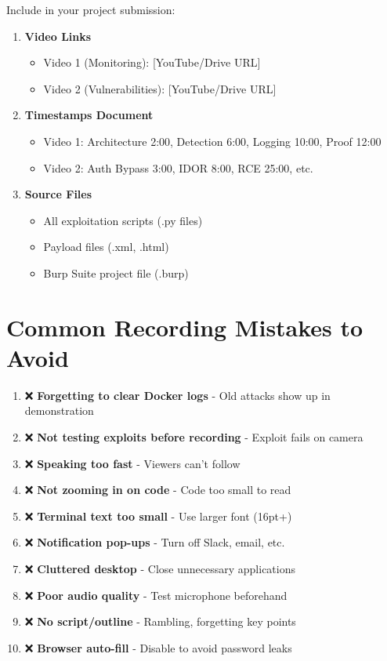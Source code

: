 \documentclass[12pt,a4paper]{article}
\begin{document}
Include in your project submission:

\begin{enumerate}[leftmargin=*]
    \item \textbf{Video Links}
    \begin{itemize}
        \item Video 1 (Monitoring): [YouTube/Drive URL]
        \item Video 2 (Vulnerabilities): [YouTube/Drive URL]
    \end{itemize}
    
    \item \textbf{Timestamps Document}
    \begin{itemize}
        \item Video 1: Architecture 2:00, Detection 6:00, Logging 10:00, Proof 12:00
        \item Video 2: Auth Bypass 3:00, IDOR 8:00, RCE 25:00, etc.
    \end{itemize}
    
    \item \textbf{Source Files}
    \begin{itemize}
        \item All exploitation scripts (.py files)
        \item Payload files (.xml, .html)
        \item Burp Suite project file (.burp)
    \end{itemize}
\end{enumerate}

\section{Common Recording Mistakes to Avoid}

\begin{enumerate}[leftmargin=*]
    \item ❌ \textbf{Forgetting to clear Docker logs} - Old attacks show up in demonstration
    \item ❌ \textbf{Not testing exploits before recording} - Exploit fails on camera
    \item ❌ \textbf{Speaking too fast} - Viewers can't follow
    \item ❌ \textbf{Not zooming in on code} - Code too small to read
    \item ❌ \textbf{Terminal text too small} - Use larger font (16pt+)
    \item ❌ \textbf{Notification pop-ups} - Turn off Slack, email, etc.
    \item ❌ \textbf{Cluttered desktop} - Close unnecessary applications
    \item ❌ \textbf{Poor audio quality} - Test microphone beforehand
    \item ❌ \textbf{No script/outline} - Rambling, forgetting key points
    \item ❌ \textbf{Browser auto-fill} - Disable to avoid password leaks
\end{enumerate}
\end{document}
